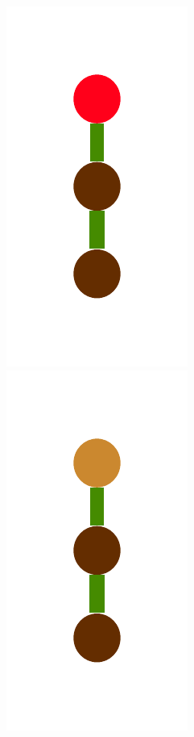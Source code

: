 \documentclass[a4paper,10pt]{article}
\begin{document}
\begin{figure}[t]
\includegraphics[scale=.26]{./figures/4-2-4-constructor-induction-pre-4.pdf}
\includegraphics[scale=.26]{./figures/4-2-4-constructor-induction-pre-5.pdf}

\end{figure}
\end{document}
